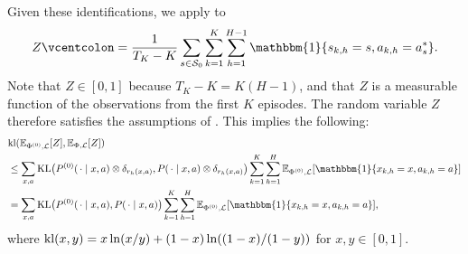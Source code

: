 \documentclass[11pt]{article}
\newcommand{\eqdef}{\vcentcolon=}
\newcommand{\mcL}{\mathcal{L}}
\newcommand{\mcS}{\mathcal{S}}
\newcommand{\mbbE}{\mathbb{E}}
\newcommand{\kl}{\textnormal{kl}}
\newcommand{\KL}{\textnormal{KL}}
\theoremstyle{definition}
\theoremstyle{definition}
\begin{document}
Given these identifications, we apply \cite[Lemma H.1]{NEURIPS2019_10a5ab2d} to
\begin{equation}
	Z
	\eqdef
	\frac{1}{T_K-K}\sum_{s\in\mcS_0}\sum_{k=1}^K\sum_{h=1}^{H-1}\mathbbm{1}\{s_{k,h}=s,a_{k,h}=a_s^*\}.
\end{equation}
Note that $Z\in [0,1]$ because $T_K-K = K(H-1)$, and that $Z$ is a measurable function of the observations from the first $K$ episodes.
The random variable $Z$ therefore satisfies the assumptions of \cite[Lemma H.1]{NEURIPS2019_10a5ab2d}.
This implies the following:
\begin{align}
	 &
	\textnormal{kl}(
	\mbbE_{\Phi^{(0)},\mcL}[Z],
	\mbbE_{\Phi,\mcL}[Z]
	)
	\label{eqn:data_processing_inequality}
	\\
	 &
	\leq
	\sum_{x,a}
	\KL\bigl(P^{(0)}(\,\cdot\mid x,a)\otimes \delta_{r_h(x,a)},P(\,\cdot\mid x,a)\otimes \delta_{r_h(x,a)}\bigr)
	\sum_{k=1}^K
	\sum_{h=1}^H
	\mbbE_{\Phi^{(0)},\mcL}[\mathbbm{1}\{x_{k,h}=x,a_{k,h}=a\}]
	\nonumber
	\\
	 &
	=
	\sum_{x,a}
	\KL\bigl(P^{(0)}(\,\cdot\mid x,a),P(\,\cdot\mid x,a)\bigr)
	\sum_{k=1}^K
	\sum_{h=1}^H
	\mbbE_{\Phi^{(0)},\mcL}[\mathbbm{1}\{x_{k,h}=x,a_{k,h}=a\}]
	,
	\nonumber
\end{align}
where $\kl(x,y)=x\ln(x/y)+(1-x)\ln((1-x)/(1-y))$ for $x,y\in [0,1]$.
\end{document}
